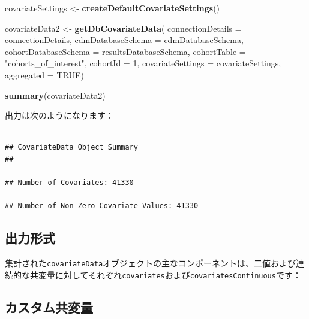 \documentclass[
  11pt]{book}
\newenvironment{Shaded}{\begin{snugshade}}{\end{snugshade}}
\newcommand{\AttributeTok}[1]{\textcolor[rgb]{0.13,0.29,0.53}{#1}}
\newcommand{\ConstantTok}[1]{\textcolor[rgb]{0.56,0.35,0.01}{#1}}
\newcommand{\DecValTok}[1]{\textcolor[rgb]{0.00,0.00,0.81}{#1}}
\newcommand{\FunctionTok}[1]{\textcolor[rgb]{0.13,0.29,0.53}{\textbf{#1}}}
\newcommand{\NormalTok}[1]{#1}
\newcommand{\OtherTok}[1]{\textcolor[rgb]{0.56,0.35,0.01}{#1}}
\newcommand{\SpecialCharTok}[1]{\textcolor[rgb]{0.81,0.36,0.00}{\textbf{#1}}}
\newcommand{\StringTok}[1]{\textcolor[rgb]{0.31,0.60,0.02}{#1}}
\theoremstyle{definition}
\theoremstyle{definition}
\theoremstyle{definition}
\theoremstyle{definition}
\theoremstyle{remark}
\begin{document}
\begin{Shaded}
\begin{Highlighting}[]
\NormalTok{covariateSettings }\OtherTok{\textless{}{-}} \FunctionTok{createDefaultCovariateSettings}\NormalTok{()}

\NormalTok{covariateData2 }\OtherTok{\textless{}{-}} \FunctionTok{getDbCovariateData}\NormalTok{(}
  \AttributeTok{connectionDetails =}\NormalTok{ connectionDetails,}
  \AttributeTok{cdmDatabaseSchema =}\NormalTok{ cdmDatabaseSchema,}
  \AttributeTok{cohortDatabaseSchema =}\NormalTok{ resultsDatabaseSchema,}
  \AttributeTok{cohortTable =} \StringTok{"cohorts\_of\_interest"}\NormalTok{,}
  \AttributeTok{cohortId =} \DecValTok{1}\NormalTok{,}
  \AttributeTok{covariateSettings =}\NormalTok{ covariateSettings,}
  \AttributeTok{aggregated =} \ConstantTok{TRUE}\NormalTok{)}

\FunctionTok{summary}\NormalTok{(covariateData2)}
\end{Highlighting}
\end{Shaded}

出力は次のようになります：

\begin{verbatim}

## CovariateData Object Summary
##

## Number of Covariates: 41330

## Number of Non-Zero Covariate Values: 41330
\end{verbatim}

\subsection{出力形式}\label{ux51faux529bux5f62ux5f0f}

集計された\texttt{covariateData}オブジェクトの主なコンポーネントは、二値および連続的な共変量に対してそれぞれ\texttt{covariates}および\texttt{covariatesContinuous}です：

\begin{Shaded}
\end{Shaded}

\subsection{カスタム共変量}\label{ux30abux30b9ux30bfux30e0ux5171ux5909ux91cf}
\end{document}
